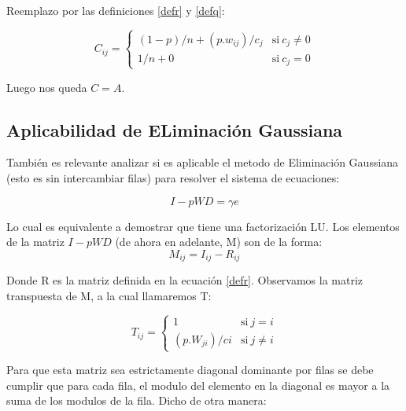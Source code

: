 Reemplazo por las definiciones \ref{defr} y \ref{defq}:

\begin{equation}
	\label{defc}
    C_{ij} = \left\{
            \begin{array}{ll}
                 (1-p)/n + (p.w_{ij})/c_j & \mathrm{si\ } c_j \neq 0 \\
                 1/n + 0                  & \mathrm{si\ } c_j = 0
            \end{array}
        \right.
\end{equation}

Luego nos queda $C=A$. \\
 
\subsection{Aplicabilidad de ELiminación Gaussiana}

También es relevante analizar si es aplicable el metodo de Eliminación Gaussiana (esto es sin intercambiar filas) para resolver el sistema de ecuaciones:

\begin{equation}
    \label{defSistema}
    I - pWD = \gamma e
\end{equation}

Lo cual es equivalente a demostrar que tiene una factorización LU.     
Los elementos de la matriz $I - pWD$ (de ahora en adelante, M) son de la forma:
\begin{equation}
    \label{defMatriz}
    M_{ij} = I_{ij} - R_{ij}
\end{equation}

Donde R es la matriz definida en la ecuación \ref{defr}. Observamos la matriz transpuesta de M, a la cual llamaremos T:

\begin{equation}
    \label{defT}
    T_{ij} = \left\{
            \begin{array}{ll}
                 1 & \mathrm{si\ } j = i \\
                 (p.W_{ji})/ci & \mathrm{si\ } j \neq i 
            \end{array}
        \right.
\end{equation}

Para que esta matriz sea estrictamente diagonal dominante por filas se debe cumplir que para cada fila, el modulo del elemento en la diagonal es mayor a la suma de los modulos de la fila. Dicho de otra manera:  


